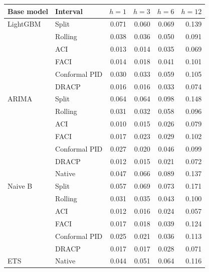 \begin{tabular}{llrrrr}
\toprule
Base model & Interval & $h{=}1$ & $h{=}3$ & $h{=}6$ & $h{=}12$ \\
\midrule
LightGBM & Split & 0.071 & 0.060 & 0.069 & 0.139 \\
 & Rolling & 0.038 & 0.036 & 0.050 & 0.091 \\
 & ACI & 0.013 & 0.014 & 0.035 & 0.069 \\
 & FACI & 0.014 & 0.018 & 0.041 & 0.101 \\
 & Conformal PID & 0.030 & 0.033 & 0.059 & 0.105 \\
 & DRACP & 0.016 & 0.016 & 0.033 & 0.074 \\
\midrule
ARIMA & Split & 0.064 & 0.064 & 0.098 & 0.148 \\
 & Rolling & 0.031 & 0.032 & 0.058 & 0.096 \\
 & ACI & 0.010 & 0.015 & 0.026 & 0.079 \\
 & FACI & 0.017 & 0.023 & 0.029 & 0.102 \\
 & Conformal PID & 0.027 & 0.020 & 0.046 & 0.099 \\
 & DRACP & 0.012 & 0.015 & 0.021 & 0.072 \\
 & Native & 0.047 & 0.066 & 0.089 & 0.137 \\
\midrule
Naive B & Split & 0.057 & 0.069 & 0.073 & 0.171 \\
 & Rolling & 0.031 & 0.035 & 0.043 & 0.100 \\
 & ACI & 0.012 & 0.016 & 0.024 & 0.057 \\
 & FACI & 0.017 & 0.018 & 0.039 & 0.124 \\
 & Conformal PID & 0.025 & 0.021 & 0.036 & 0.113 \\
 & DRACP & 0.017 & 0.017 & 0.028 & 0.071 \\
\midrule
ETS & Native & 0.044 & 0.051 & 0.064 & 0.116 \\
\bottomrule
\end{tabular}
